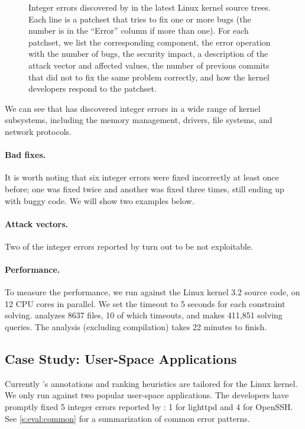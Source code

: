 \begin{figure*}
\centering
\footnotesize

\caption{Integer errors discovered by \sys in the latest Linux
kernel source trees.  Each line is a patchset that tries to fix one
or more bugs (the number is in the ``Error'' column if more than
one).  For each patchset, we list the corresponding component, the
error operation with the number of bugs, the security impact, a
description of the attack vector and affected values, the number
of previous commits that did not to fix the same problem correctly,
and how the kernel developers respond to the patchset.}
\label{f:data:linux}
\end{figure*}

We can see that \sys has discovered integer errors in a wide range
of kernel subsystems, including the memory management, drivers,
file systems, and network protocols.


\paragraph{Bad fixes.}
It is worth noting that six integer errors were fixed incorrectly
at least once before; one was fixed twice and another was fixed
three times, still ending up with buggy code.  We will show two
examples below.

\paragraph{Attack vectors.}

Two of the integer errors reported by \sys turn out to be not
exploitable.

\paragraph{Performance.}
To measure the performance, we run \sys against the Linux kernel
3.2 source code, on 12 CPU cores in parallel.  We set the timeout
to 5 seconds for each constraint solving.   \sys analyzes 8637 files,
10 of which timeouts, and makes 411,851 solving queries.  The
analysis (excluding compilation) takes 22 minutes to finish.

\subsection{Case Study: User-Space Applications}

Currently \sys's annotations and ranking heuristics are tailored
for the Linux kernel.  We only run \sys against two popular user-space
applications.  The developers have promptly fixed 5 integer errors
reported by \sys: 1 for lighttpd and 4 for OpenSSH.  See
\autoref{s:eval:common} for a summarization of common error patterns.

